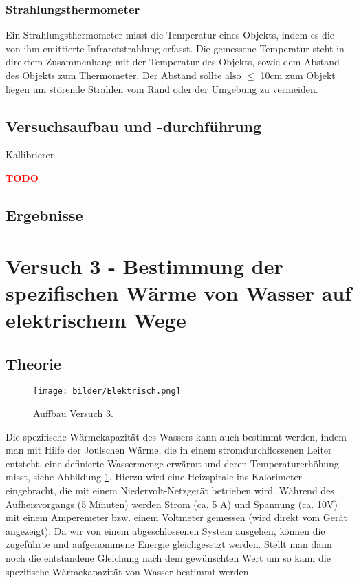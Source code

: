    \subsubsection*{Strahlungsthermometer}
   Ein Strahlungsthermometer misst die Temperatur eines Objekts, indem es die von ihm emittierte Infrarotstrahlung erfasst. Die gemessene Temperatur steht in direktem Zusammenhang mit der Temperatur des Objekts, sowie dem Abstand des Objekts zum Thermometer.  Der Abstand sollte also $\leq$ 10cm zum Objekt liegen um störende Strahlen vom Rand oder der Umgebung zu vermeiden. 
    \subsection{Versuchsaufbau und -durchführung}
     Kallibrieren

		\textbf{\textcolor{red}{TODO}}
    \subsection{Ergebnisse}
      

\section{Versuch 3 - Bestimmung der spezifischen Wärme von Wasser auf elektrischem Wege}
    \subsection{Theorie}
    
        	\begin{figure}[ht]
    	\label{fig:abb3}
    	\begin{center}
    		\texttt{[image: bilder/Elektrisch.png]}
    		\caption{Auffbau Versuch 3.}
    	\end{center}
    \end{figure}
    Die spezifische Wärmekapazität des Wassers kann auch bestimmt werden, indem man mit Hilfe der
    Joulschen Wärme, die in einem stromdurchflossenen Leiter entsteht, eine definierte Wassermenge
    erwärmt und deren Temperaturerhöhung misst, siehe Abbildung \ref{fig:abb3}. Hierzu wird eine Heizspirale ins Kalorimeter
    eingebracht, die mit einem Niedervolt-Netzgerät betrieben wird. Während des Aufheizvorgangs (5
    Minuten) werden Strom (ca. 5 A) und Spannung (ca. 10V) mit einem Amperemeter bzw. einem
    Voltmeter gemessen (wird direkt vom Gerät angezeigt). 
   Da wir von einem abgeschlossenen System ausgehen, können die zugeführte und aufgenommene
   Energie gleichgesetzt werden. Stellt man dann noch die entstandene Gleichung nach dem
   gewünschten Wert um so kann die spezifische Wärmekapazität von Wasser bestimmt werden.
   
